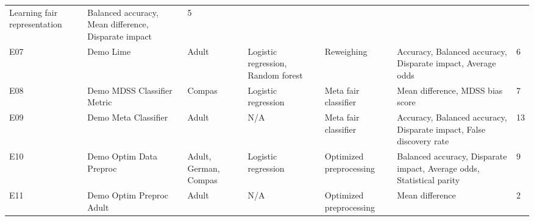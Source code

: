 \documentclass[sigconf,review]{acmart}
\begin{document}
\begin{table}[]
\begin{tabular}{ p{1em} L{10em} R{4em} R{8em} R{9em} R{12em} R{2.5em} }
		Learning fair representation &
		Balanced accuracy, Mean difference, Disparate impact &
		5 \\
		E07 &
		Demo Lime &
		Adult &
		Logistic regression, Random forest &
		Reweighing &
		Accuracy, Balanced accuracy, Disparate impact, Average odds &
		6 \\
		E08 &
		Demo MDSS Classifier Metric &
		Compas &
		Logistic regression &
		Meta fair classifier &
		Mean difference, MDSS bias score &
		7 \\
		E09 &
		Demo Meta Classifier &
		Adult &
		N/A &
		Meta fair classifier &
		Accuracy, Balanced accuracy, Disparate impact, False discovery rate &
		13 \\
		E10 &
		Demo Optim Data Preproc &
		Adult, German, Compas &
		Logistic regression &
		Optimized preprocessing &
		Balanced accuracy, Disparate impact, Average odds, Statistical parity &
		9 \\
		E11 &
		Demo Optim Preproc Adult &
		Adult &
		N/A &
		Optimized preprocessing &
		Mean difference &
		2 \\
	 	\hline
	\end{tabular}
\end{table}
\end{document}
